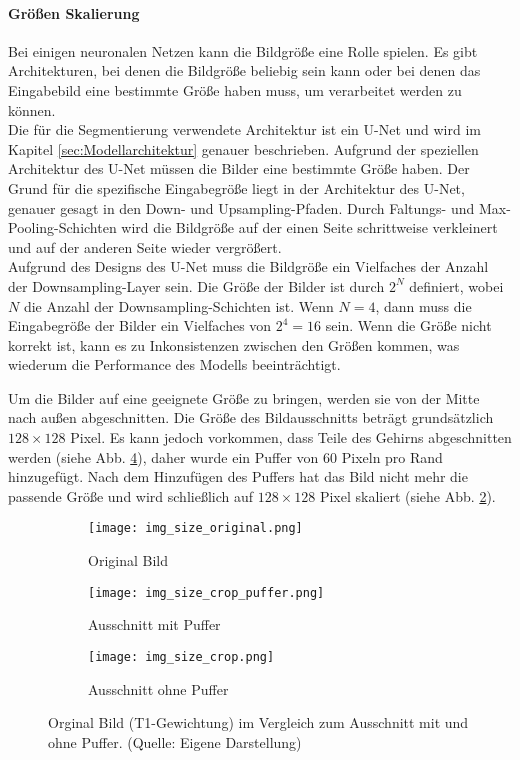 \paragraph{Größen Skalierung}
\label{paragraph:GrößenSkalierung}
Bei einigen neuronalen Netzen kann die Bildgröße eine Rolle spielen. Es gibt Architekturen, bei denen die Bildgröße beliebig sein kann oder bei denen das Eingabebild eine bestimmte Größe haben muss, um verarbeitet werden zu können. \\
Die für die Segmentierung verwendete Architektur ist ein U-Net und wird im Kapitel \ref{sec:Modellarchitektur} genauer beschrieben. Aufgrund der speziellen Architektur des U-Net müssen die Bilder eine bestimmte Größe haben. Der Grund für die spezifische Eingabegröße liegt in der Architektur des U-Net, genauer gesagt in den Down- und Upsampling-Pfaden. Durch Faltungs- und Max-Pooling-Schichten wird die Bildgröße auf der einen Seite schrittweise verkleinert und auf der anderen Seite wieder vergrößert. \\
Aufgrund des Designs des U-Net muss die Bildgröße ein Vielfaches der Anzahl der Downsampling-Layer sein. Die Größe der Bilder ist durch $2^N$ definiert, wobei $N$ die Anzahl der Downsampling-Schichten ist. Wenn $N=4$, dann muss die Eingabegröße der Bilder ein Vielfaches von $2^4=16$ sein. Wenn die Größe nicht korrekt ist, kann es zu Inkonsistenzen zwischen den Größen kommen, was wiederum die Performance des \gls{Modell}s beeinträchtigt. \cite[vgl.][]{Ronneberger2015}

Um die Bilder auf eine geeignete Größe zu bringen, werden sie von der Mitte nach außen abgeschnitten. Die Größe des Bildausschnitts beträgt grundsätzlich $128\times128$ Pixel. Es kann jedoch vorkommen, dass Teile des Gehirns abgeschnitten werden (siehe Abb. \ref{fig:GrößeOhnePuffer}), daher wurde ein Puffer von 60 Pixeln pro Rand hinzugefügt. Nach dem Hinzufügen des Puffers hat das Bild nicht mehr die passende Größe und wird schließlich auf $128\times128$ Pixel skaliert (siehe Abb. \ref{fig:GrößePuffer}).
\begin{figure}[ht]
	\centering
	\begin{subfigure}[b]{0.4\textwidth}
		\centering
		\texttt{[image: img\_size\_original.png]}
		\caption{Original Bild}
		\label{fig:GrößeOrg}
	\end{subfigure}
\vfil
	\begin{subfigure}[b]{0.4\linewidth}
		\centering
		\texttt{[image: img\_size\_crop\_puffer.png]}
		\caption{Ausschnitt mit Puffer}
		\label{fig:GrößePuffer}
	\end{subfigure}
\hfil
	\begin{subfigure}[b]{0.4\linewidth}
		\centering
		\texttt{[image: img\_size\_crop.png]}
		\caption{Ausschnitt ohne Puffer}
		\label{fig:GrößeOhnePuffer}
	\end{subfigure}
	\caption{Orginal Bild (T1-Gewichtung) im Vergleich zum Ausschnitt mit und ohne Puffer. (Quelle: Eigene Darstellung)}
\end{figure} 


